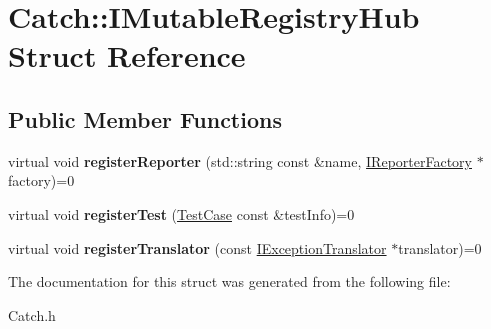 \hypertarget{struct_catch_1_1_i_mutable_registry_hub}{\section{Catch\-:\-:I\-Mutable\-Registry\-Hub Struct Reference}
\label{struct_catch_1_1_i_mutable_registry_hub}
}
\subsection*{Public Member Functions}
\begin{DoxyCompactItemize}
\item 
\hypertarget{struct_catch_1_1_i_mutable_registry_hub_a1f61ed2b3f2d160b31a0f2c1d9a52af1}{virtual void {\bfseries register\-Reporter} (std\-::string const \&name, \hyperlink{struct_catch_1_1_i_reporter_factory}{I\-Reporter\-Factory} $\ast$factory)=0}\label{struct_catch_1_1_i_mutable_registry_hub_a1f61ed2b3f2d160b31a0f2c1d9a52af1}

\item 
\hypertarget{struct_catch_1_1_i_mutable_registry_hub_a11b85c6744d88c9f83fe16ad4a8dd451}{virtual void {\bfseries register\-Test} (\hyperlink{class_catch_1_1_test_case}{Test\-Case} const \&test\-Info)=0}\label{struct_catch_1_1_i_mutable_registry_hub_a11b85c6744d88c9f83fe16ad4a8dd451}

\item 
\hypertarget{struct_catch_1_1_i_mutable_registry_hub_ae6825365102693cf7707db022a2c2b49}{virtual void {\bfseries register\-Translator} (const \hyperlink{struct_catch_1_1_i_exception_translator}{I\-Exception\-Translator} $\ast$translator)=0}\label{struct_catch_1_1_i_mutable_registry_hub_ae6825365102693cf7707db022a2c2b49}

\end{DoxyCompactItemize}


The documentation for this struct was generated from the following file\-:\begin{DoxyCompactItemize}
\item 
Catch.\-h\end{DoxyCompactItemize}
